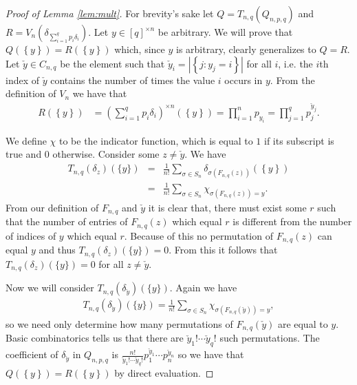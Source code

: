 \documentclass[aos,preprint]{imsart}
\def\l{\left}
\def\r{\right}
\theoremstyle{plain}
\theoremstyle{defintion}
\begin{document}
\begin{proof}[Proof of Lemma \ref{lem:mult}]
	For brevity's sake let $Q =T_{n,q}\left( Q_{n,p,q} \right)$ and  $R= V_n\left( \delta_{\sum_{i=1}^q p_i \delta_i} \right)$. Let $y \in \left[ q \right]^{\times n}$ be arbitrary. We will prove that $Q(\l\{y\r\}) = R(\l\{y\r\})$ which, since $y$ is arbitrary, clearly generalizes to $Q=R$. Let $\check{y}\in C_{n,q}$ be the element such that $\check{y}_i = \l|\left\{ j:y_j = i \right\}\r|$ for all $i$, i.e. the $i$th index of $\check{y}$ contains the number of times the value $i$ occurs in $y$. From the definition of $V_n$ we have that 
	\begin{align*}
		R(\l\{y\r\}) &= \left( \sum_{i=1}^q p_i \delta_i \right)^{\times n} \left( \left\{ y \right\} \right) = \prod_{i=1}^n p_{y_i} = \prod_{j=1}^{q}p_j^{\check{y}_j}.
	\end{align*}

	 We define $\chi$ to be the indicator function, which is equal to $1$ if its subscript is true and $0$ otherwise. Consider some $z\neq \check{y}$. We have
	\begin{eqnarray*}
		T_{n,q}\left( \delta_z \right)(\{y\}) 
		&=& \frac{1}{n!} \sum_{\sigma \in S_n} \delta_{ \sigma\l(F_{n,q}(z)\r)}\left( \left\{ y \right\} \right)\\
		&=& \frac{1}{n!} \sum_{\sigma \in S_n}  \chi_{\sigma\l(F_{n,q}(z)\r)= y}.
	\end{eqnarray*}
	From our definition of $F_{n,q}$ and $\check{y}$ it is clear that, there must exist some $r$ such that the number of entries of $F_{n,q}(z)$ which equal $r$ is different from the number of indices of $y$ which equal $r$. Because of this no permutation of $F_{n,q}(z)$ can equal $y$ and thus $T_{n,q}\left( \delta_z \right)(\{y\}) = 0$. From this it follows that $T_{n,q}\left( \delta_z \right)(\{y\}) = 0$ for all $z\neq \check{y}$.

	Now we will consider $T_{n,q}\left( \delta_{\check{y}} \right)(\{y\})$. Again we have
	\begin{eqnarray*}
		T_{n,q}\left( \delta_{\check{y}} \right)(\{y\}) =  \frac{1}{n!} \sum_{\sigma \in S_n}  \chi_{\sigma\l(F_{n,q}(\check{y})\r)= y},
	\end{eqnarray*}
	so we need only determine how many permutations of $F_{n,q}\left( \check{y} \right)$ are equal to $y$. Basic combinatorics tells us that there are $\check{y}_1!\cdots \check{y}_q!$ such permutations. The coefficient of $\delta_{\check{y}}$ in $Q_{n,p,q}$ is $\frac{n!}{\check{y}_1! \cdots \check{y}_q!} p_1^{\check{y}_1}\cdots p_n^{\check{y}_n}$ so we have that $Q(\l\{y\r\}) = R(\l\{y\r\})$ by direct evaluation.
\end{proof}
\end{document}

